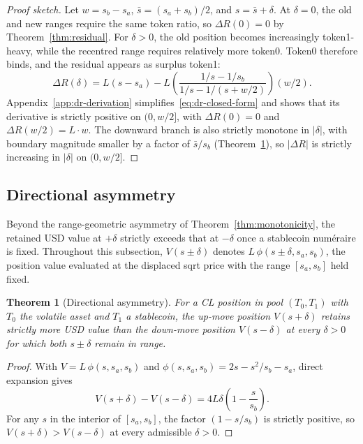 \documentclass[11pt,a4paper]{article}
\theoremstyle{plain}
\newtheorem{theorem}{Theorem}
\begin{document}
\begin{proof}[Proof sketch]
Let $w = s_b - s_a$, $\bar{s} = (s_a + s_b)/2$, and $s = \bar{s} + \delta$. At $\delta = 0$, the old and new ranges require the same token ratio, so $\Delta R(0) = 0$ by Theorem~\ref{thm:residual}. For $\delta > 0$, the old position becomes increasingly token1-heavy, while the recentred range requires relatively more token0. Token0 therefore binds, and the residual appears as surplus token1:
\begin{equation}\label{eq:dr-closed-form}
\Delta R(\delta) = L(s - s_a) - L\!\left(\frac{1/s - 1/s_b}{1/s - 1/(s + w/2)}\right)(w/2).
\end{equation}
Appendix~\ref{app:dr-derivation} simplifies~\eqref{eq:dr-closed-form} and shows that its derivative is strictly positive on $(0, w/2]$, with $\Delta R(0) = 0$ and $\Delta R(w/2) = L \cdot w$. The downward branch is also strictly monotone in $|\delta|$, with boundary magnitude smaller by a factor of $\bar{s}/s_b$ (Theorem~\ref{thm:directional}), so $|\Delta R|$ is strictly increasing in $|\delta|$ on $(0, w/2]$.
\end{proof}

\subsection{Directional asymmetry}\label{sec:directional}

Beyond the range-geometric asymmetry of Theorem~\ref{thm:monotonicity}, the retained USD value at $+\delta$ strictly exceeds that at $-\delta$ once a stablecoin num\'eraire is fixed. Throughout this subsection, $V(s \pm \delta)$ denotes $L\,\phi(s \pm \delta, s_a, s_b)$, the position value evaluated at the displaced sqrt price with the range $[s_a, s_b]$ held fixed.

\begin{theorem}[Directional asymmetry]\label{thm:directional}
For a CL position in pool $(T_0, T_1)$ with $T_0$ the volatile asset and $T_1$ a stablecoin, the up-move position $V(s+\delta)$ retains strictly more USD value than the down-move position $V(s-\delta)$ at every $\delta > 0$ for which both $s \pm \delta$ remain in range.
\end{theorem}

\begin{proof}
With $V = L\,\phi(s, s_a, s_b)$ and $\phi(s, s_a, s_b) = 2s - s^2/s_b - s_a$, direct expansion gives
\begin{equation}\label{eq:directional-identity}
V(s + \delta) - V(s - \delta) = 4 L \delta \left(1 - \frac{s}{s_b}\right).
\end{equation}
For any $s$ in the interior of $[s_a, s_b]$, the factor $(1 - s/s_b)$ is strictly positive, so $V(s+\delta) > V(s-\delta)$ at every admissible $\delta > 0$.
\end{proof}
\end{document}
